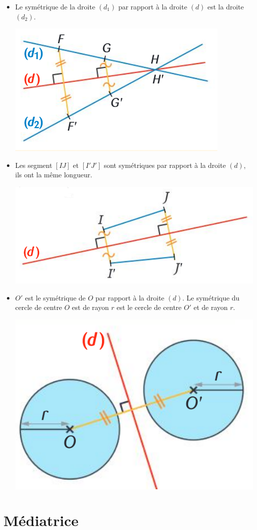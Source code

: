 \documentclass[12pt,a4paper]{article}
\begin{document}
	\begin{myexs}
		\begin{itemize}
			\item Le symétrique de la droite $(d_1)$ par rapport à la droite $(d)$ est la droite $(d_2)$.
			\begin{center}
				\includegraphics[scale=0.6]{prop1}
			\end{center}
		
			\item Les segment $[IJ]$ et $[I'J']$ sont symétriques par rapport à la droite $(d)$, ils ont la même longueur.
			\begin{center}
				\includegraphics[scale=0.4]{prop2}
			\end{center}
		
		
			\item $O'$ est le symétrique de $O$ par rapport à la droite $(d)$. Le symétrique du cercle de centre $O$ est de rayon $r$ est le cercle de centre $O'$ et de rayon $r$.
			\begin{center}
				\includegraphics[scale=0.4]{prop3}
			\end{center}
		\end{itemize}
	\end{myexs}

\section{Médiatrice}



\end{document}
